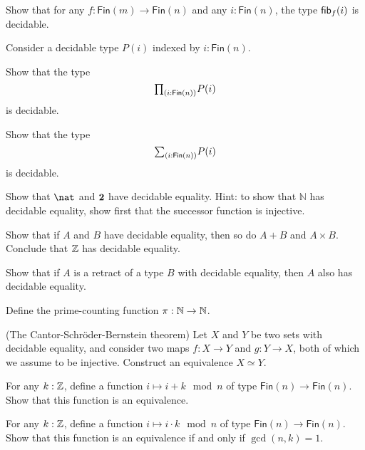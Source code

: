 \begin{exercises}
\item Show that for any $f:\mathsf{Fin}(m)\to\mathsf{Fin}(n)$ and any $i:\mathsf{Fin}(n)$, the type $\mathsf{fib}_{f}(i)$ is decidable.
\item Consider a decidable type $P(i)$ indexed by $i:\mathsf{Fin}(n)$.
  \begin{subexenum}
  \item Show that the type
    \begin{equation*}
      \prd{i:\mathsf{Fin}(n)}P(i)
    \end{equation*}
    is decidable.
  \item Show that the type
    \begin{equation*}
      \sm{i:\mathsf{Fin}(n)}P(i)
    \end{equation*}
    is decidable.
  \end{subexenum}
\item
  \begin{subexenum}
  \item Show that $\nat$ and $\mathbf{2}$ have decidable equality. Hint: to show that $\mathbb{N}$ has decidable equality, show first that the successor function is injective.
  \item Show that if $A$ and $B$ have decidable equality, then so do $A+B$ and $A\times B$. Conclude that ${\mathbb{Z}}$ has decidable equality.
  \item Show that if $A$ is a retract of a type $B$ with decidable equality, then $A$ also has decidable equality.
  \end{subexenum}
\item Define the prime-counting function $\pi:{\mathbb{N}}\to{\mathbb{N}}$.
\item (The Cantor-Schr\"oder-Bernstein theorem) Let $X$ and $Y$ be two sets with decidable equality, and consider two maps $f:X\to Y$ and $g:Y\to X$, both of which we assume to be injective. Construct an equivalence $X\simeq Y$.
\item For any $k:{\mathbb{Z}}$, define a function $i\mapsto i+k \mod n$ of type $\mathsf{Fin}(n)\to\mathsf{Fin}(n)$. Show that this function is an equivalence.
  \item For any $k:{\mathbb{Z}}$, define a function $i\mapsto i\cdot k \mod n$ of type $\mathsf{Fin}(n)\to\mathsf{Fin}(n)$. Show that this function is an equivalence if and only if $\gcd(n,k)=1$.
\end{exercises}
